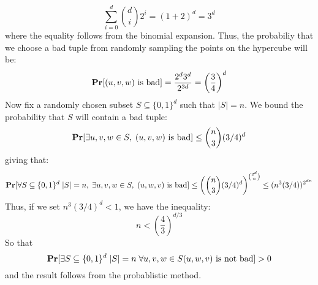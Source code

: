\documentclass[12pt]{article}%
\begin{document}
\begin{enumerate}
    $$ \sum_{i=0}^d {d \choose i} 2^{i} = (1 + 2)^d = 3^d $$
    where the equality follows from the binomial expansion. Thus, the probabiliy that we choose a bad tuple from randomly sampling the points on the hypercube will be:
    $$ {\bf Pr}[(u,v,w) \text{ is bad}] = \frac{2^d 3^d}{2^{3d}} = \left(\frac{3}{4}\right)^d $$
    Now fix a randomly chosen subset $S \subseteq \{0,1\}^d$ such that $|S| = n$. We bound the probability that $S$ will contain a bad tuple:
    $${\bf Pr}[\exists u,v,w \in S ,\; (u,v,w) \text{ is bad}] \leq {n \choose 3}(3/4)^d$$
    giving that:
    $${\bf Pr}[\forall S \subseteq \{0,1\}^d \; |S| = n, \; \exists u,v,w \in S, \; (u,w,v) \text{ is bad}] \leq \left({n \choose 3}(3/4)^d\right)^{{2^d \choose n}} \leq (n^3 (3/4))^{2^{dn}} $$
    Thus, if we set $n^3(3/4)^d < 1$, we have the inequality:
    $$ n < \left(\frac{4}{3}\right)^{d/3} $$
    So that
    $${\bf Pr}[\exists S \subseteq \{0,1\}^d \; |S| = n \; \forall u,v,w \in S (u,w,v) \text{ is not bad}] > 0 $$
    and the result follows from the probablistic method.

\end{enumerate}
\end{document}
